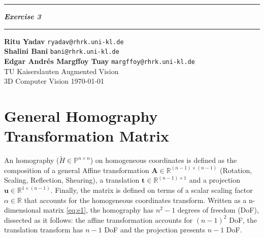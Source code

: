 \documentclass{article}
\newcommand{\squishlist}{
 \begin{list}{$\bullet$}
  { \setlength{\itemsep}{0pt}
     \setlength{\parsep}{3pt}
     \setlength{\topsep}{3pt}
     \setlength{\partopsep}{0pt}
     \setlength{\leftmargin}{1.5em}
     \setlength{\labelwidth}{1em}
     \setlength{\labelsep}{0.5em} } }
\newcommand{\squishend}{
  \end{list}  }
\begin{document}
 \def\maketitle{%
 \thispagestyle{plain}
 \vspace{-10ex}
 \hrule
 \bigskip
 \begin{center}
 {\Large{\textbf{\@title}}}
 \end{center}
 \bigskip
 \hrule

 \bigskip

 \begin{flushleft}
 \textbf{\normalsize{Ritu Yadav}} \hfill \texttt{ryadav@rhrk.uni-kl.de}
 \\
 \vspace{5pt}
 \textbf{\normalsize{Shalini Bani}} \hfill \texttt{bani@rhrk.uni-kl.de}
 \\
 \vspace{5pt}
 \textbf{\normalsize{Edgar Andr\'{e}s Margffoy Tuay}} \hfill \texttt{margffoy@rhrk.uni-kl.de}
 \\
 \vspace{5pt}
 TU Kaiserslauten \hfill Augmented Vision
 \\
 \vspace{5pt}
 3D Computer Vision \vspace{5pt}
\hfill \today \\ 
 \end{flushleft}
 }
\def\title#1{\def\@title{#1}}
\title{\textit{Exercise 3}}



\maketitle

\section{General Homography Transformation Matrix}
An homography ($\tilde{H} \in \mathbb{P}^{n \times n}$) on homogeneous coordinates is defined as the composition of a general Affine transformation $\mathbf{A} \in \mathbb{R}^{(n - 1) \times (n - 1)}$ (Rotation, Scaling, Reflection, Shearing), a translation $\mathbf{t} \in \mathbb{R}^{(n - 1) \times 1}$ and a projection $\mathbf{u} \in \mathbb{R}^{1 \times (n - 1)}$. Finally, the matrix is defined on terms of a scalar scaling factor $\alpha \in \mathbb{R}$ that accounts for the homogeneous coordinates transform. Written as a n-dimensional matrix \eqref{eq:e1}, the homography has $n^2 - 1$ degrees of freedom (DoF), dissected as it follows: the affine transformation accounts for $(n - 1)^2$ DoF, the translation transform has $n - 1$ DoF and the projection presents $n -1$ DoF. 
\end{document}

